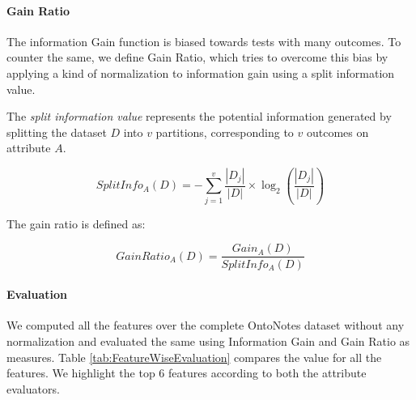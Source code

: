 \paragraph{Gain Ratio}
The information Gain function is biased towards tests with many outcomes. To counter the same, we define Gain Ratio, which tries to overcome this bias by applying a kind of normalization to information gain using a split information value.

The \textit{split information value} represents the potential information generated by splitting the dataset $D$ into $v$ partitions, corresponding to $v$ outcomes on attribute $A$.

\begin{equation}
SplitInfo_A(D) = -\sum_{j=1}^{v}\frac{|D_j|}{|D|} \times \log_2\left(\frac{|D_j|}{|D|}\right)
\end{equation}

The gain ratio is defined as:

\begin{equation}
GainRatio_A(D) = \frac{Gain_A(D)}{SplitInfo_A(D)}
\end{equation}

\paragraph{Evaluation}
We computed all the features over the complete OntoNotes dataset without any normalization and evaluated the same using Information Gain and Gain Ratio as measures. Table \ref{tab:FeatureWiseEvaluation} compares the value for all the features. We highlight the top 6 features according to both the attribute evaluators.

